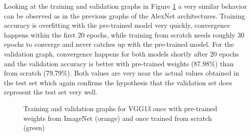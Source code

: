 \begin{table}[H] \centering
{}
\caption{Running the best VGG architecture three times with the found hyperparameters and averaging across the total of runs. }
\label{tbl:VGG_averaged}
\end{table}

Looking at the training and validation graphs in Figure \ref{fig:vgg13-graph} a very similar behavior can be observed as in the previous graphs of the AlexNet architectures. Training accuracy is overfitting with the pre-trained model very quickly, convergence happens within the first 20 epochs, while training from scratch needs roughly 30 epochs to converge and never catches up with the pre-trained model. For the validation graph, convergence happens for both models shortly after 20 epochs and the validation accuracy is better with pre-trained weights (87.98\%) than from scratch (79.79\%). Both values are very near the actual values obtained in the test set which again confirms the hypothesis that the validation set does represent the test set very well.

\begin{figure}[H]
\centering
\caption{Training and validation graphs for VGG13 once with pre-trained weights from ImageNet (orange) and once trained from scratch (green)}
\label{fig:vgg13-graph}
\end{figure}

